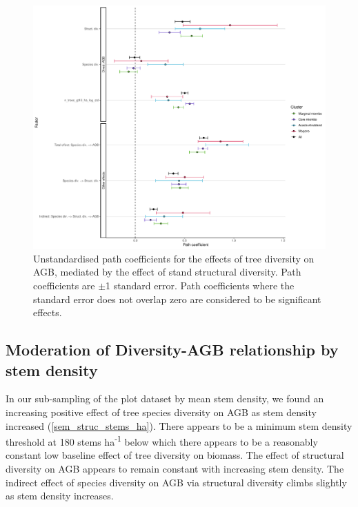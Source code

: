 \documentclass[11pt,a4paper]{article}
\newcommand{\textapprox}{\raisebox{0.5ex}{\texttildelow}}  %
\begin{document}
\begin{figure}[H]
\centering
	\includegraphics[width=\textwidth]{struc_model_slopes_all}
	\caption{Unstandardised path coefficients for the effects of tree diversity on AGB, mediated by the effect of stand structural diversity. Path coefficients are $\pm$1 standard error. Path coefficients where the standard error does not overlap zero are considered to be significant effects.}
	\label{struc_model_slopes_all}
\end{figure}



\subsection{Moderation of Diversity-AGB relationship by stem density}

In our sub-sampling of the plot dataset by mean stem density, we found an increasing positive effect of tree species diversity on AGB as stem density increased (\autoref{sem_struc_stems_ha}). There appears to be a minimum stem density threshold at \textapprox{}180 stems ha\textsuperscript{-1} below which there appears to be a reasonably constant low baseline effect of tree diversity on biomass. The effect of structural diversity on AGB appears to remain constant with increasing stem density. The indirect effect of species diversity on AGB via structural diversity climbs slightly as stem density increases.
\end{document}
